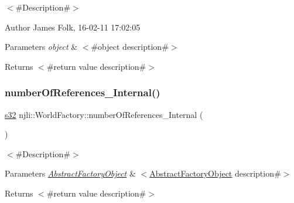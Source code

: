 $<$\#\+Description\#$>$ 

\begin{DoxyAuthor}{Author}
James Folk, 16-\/02-\/11 17\+:02\+:05
\end{DoxyAuthor}

\begin{DoxyParams}{Parameters}
{\em object} & $<$\#object description\#$>$\\
\hline
\end{DoxyParams}
\begin{DoxyReturn}{Returns}
$<$\#return value description\#$>$ 
\end{DoxyReturn}
\mbox{\label{classnjli_1_1_world_factory_a3adffe81b38fb2a57d28405f5b299211}} 
\subsubsection{\texorpdfstring{number\+Of\+References\+\_\+\+Internal()}{numberOfReferences\_Internal()}}
{\footnotesize\ttfamily \mbox{\hyperlink{_util_8h_aa62c75d314a0d1f37f79c4b73b2292e2}{s32}} njli\+::\+World\+Factory\+::number\+Of\+References\+\_\+\+Internal (\begin{DoxyParamCaption}\item[{\mbox{\hyperlink{classnjli_1_1_abstract_factory_object}{Abstract\+Factory\+Object}} $\ast$}]{ }\end{DoxyParamCaption})\hspace{0.3cm}{\ttfamily [protected]}}

$<$\#\+Description\#$>$


\begin{DoxyParams}{Parameters}
{\em \mbox{\hyperlink{classnjli_1_1_abstract_factory_object}{Abstract\+Factory\+Object}}} & $<$\mbox{\hyperlink{classnjli_1_1_world_factory_a59f5fcb165066624f68fb5417aa3586e}{Abstract\+Factory\+Object}} description\#$>$\\
\hline
\end{DoxyParams}
\begin{DoxyReturn}{Returns}
$<$\#return value description\#$>$ 
\end{DoxyReturn}
\mbox{\label{classnjli_1_1_world_factory_a9a199d5c17a90ab9b15246e7f3f3d394}} 
